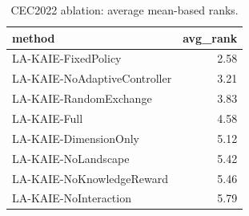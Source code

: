 \begin{table}[t]
\centering
\scriptsize
\caption{CEC2022 ablation: average mean-based ranks.}
\label{tab:cec2022_ablation_ranks}
\begin{tabular}{lr}
\toprule
method & avg\_rank \\
\midrule
LA-KAIE-FixedPolicy & 2.58 \\
LA-KAIE-NoAdaptiveController & 3.21 \\
LA-KAIE-RandomExchange & 3.83 \\
LA-KAIE-Full & 4.58 \\
LA-KAIE-DimensionOnly & 5.12 \\
LA-KAIE-NoLandscape & 5.42 \\
LA-KAIE-NoKnowledgeReward & 5.46 \\
LA-KAIE-NoInteraction & 5.79 \\
\bottomrule
\end{tabular}
\end{table}
